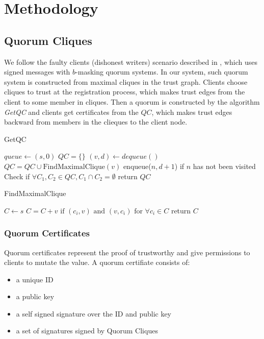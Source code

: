 \section{Methodology}
\subsection{Quorum Cliques}
We follow the faulty clients (dishonest writers) scenario described in
\cite{Delhi:1,Delhi:2}, which uses signed messages with
$b$-masking quorum systems. In our system, such quorum system is
constructed from maximal cliques in the trust graph. 
Clients choose cliques to trust at the registration process, which
makes trust edges from the client to some member in cliques. Then a
quorum is constructed by the algorithm {\em GetQC} and clients get
certificates from the $QC$, which makes trust edges backward from
members in the clieques to the client node.

\begin{algorithm}
  \caption{GetQC}
  \SetAlgoNoLine
  $queue \leftarrow {(s, 0)}$\;
  $QC = \{\}$\;
  {
    $(v, d) \leftarrow dequeue()$\;
    $QC = QC \cup \text{FindMaximalClique}(v)$\;
    {
      enqueue($n, d + 1$) if $n$ has not been visited\;
    }
  }
  Check if $\forall C_1, C_2 \in QC, C_1 \cap C_2 = \emptyset$\;
  return $QC$
\end{algorithm}

\begin{algorithm}
  \caption{FindMaximalClique}
  \SetAlgoNoLine
  $C \leftarrow {s}$\;
  {
    $C = C + {v} \text{ if } (c_i, v) \text{ and } (v, c_i)
    \text{ for } \forall c_i \in C$\;
  }
  return $C$
\end{algorithm}

\subsubsection*{Quorum Certificates}
Quorum certificates represent the proof of trustworthy and give
permissions to clients to mutate the value.
A quorum certifiate consists of:
\begin{itemize}
\item a unique ID
\item a public key
\item a self signed signature over the ID and public key
\item a set of signatures signed by Quorum Cliques
\end{itemize}

